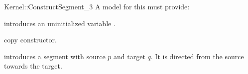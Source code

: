 \begin{ccRefFunctionObjectConcept}{Kernel::ConstructSegment_3}
A model for this must provide:



\ccHidden {}
             {introduces an uninitialized variable .}

\ccHidden {}
 	    {copy constructor.}

            {introduces a segment  with source $p$
             and target $q$. It is directed from the source towards
             the target.}


\ccSeeAlso
{}\\

\end{ccRefFunctionObjectConcept}
